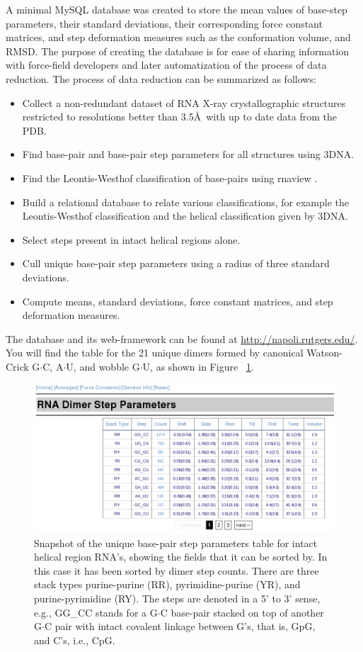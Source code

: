 A  minimal MySQL  database was  created to  store the  mean  values of
base-step parameters,  their standard deviations,  their corresponding
force  constant matrices, and  step deformation  measures such  as the
conformation volume, and RMSD. The purpose of creating the database is
for ease of sharing  information with force-field developers and later
automatization of the process of  data reduction.  The process of data
reduction can be summarized as follows:
\begin{itemize}
\item{Collect a non-redundant dataset of RNA X-ray crystallographic
  structures restricted to resolutions better than 3.5\AA~with up to
  date data from the PDB.}
\item{Find base-pair and base-pair step parameters for all structures
  using 3DNA.}
\item{Find the Leontis-Westhof classification of base-pairs using
  rnaview \cite{yang2003}.}
\item{Build a relational database to relate various classifications,
  for example the Leontis-Westhof classification and the helical
  classification given by 3DNA.}
\item{Select steps present in intact helical regions alone.}
\item{Cull unique base-pair step parameters using a radius of three
  standard deviations.}
\item{Compute means, standard deviations, force constant matrices, and
step deformation measures.}  
\end{itemize}  

The    database   and    its   web-framework    can   be    found   at
\url{http://napoli.rutgers.edu/}. You  will find the table  for the 21
unique dimers  formed by canonical  Watson-Crick G$\cdot$C, A$\cdot$U,
and wobble G$\cdot$U, as shown in Figure ~\ref{fig:average}.

\begin{figure}[htbp]
\centering
\includegraphics[angle=0, scale=0.4]{Chapter4/average.png}
\caption{Snapshot of the unique base-pair step parameters table for
  intact helical region RNA's, showing the fields that it can be
  sorted by. In this case it has been sorted by dimer step
  counts. There are three stack types purine-purine (RR),
  pyrimidine-purine (YR), and purine-pyrimidine (RY). The steps are
  denoted in a 5' to 3' sense, e.g., GG\_CC stands for a G$\cdot$C
  base-pair stacked on top of another G$\cdot$C pair with intact
  covalent linkage between G's, that is, GpG, and C's, i.e., CpG.}
\label{fig:average}
\end{figure}  

